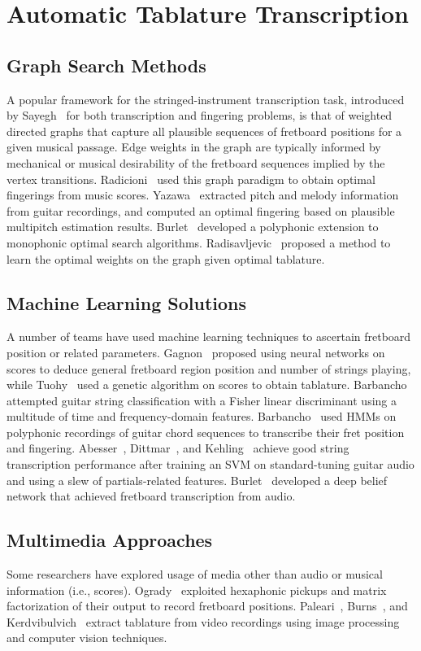 \documentclass[12pt]{cmuthesis}
\begin{document}
\section{Automatic Tablature Transcription}
\subsection{Graph Search Methods}
A popular framework for the stringed-instrument transcription task, introduced by Sayegh~\cite{sayegh1989} for both transcription and fingering problems, is that of weighted directed graphs that capture all plausible sequences of fretboard positions for a given musical passage. Edge weights in the graph are typically informed by mechanical or musical desirability of the fretboard sequences implied by the vertex transitions. Radicioni~\cite{radicioni2005} used this graph paradigm to obtain optimal fingerings from music scores. Yazawa~\cite{yazawa2013} extracted pitch and melody information from guitar recordings, and computed an optimal fingering based on plausible multipitch estimation results. Burlet~\cite{burlet2013} developed a polyphonic extension to monophonic optimal search algorithms. Radisavljevic~\cite{radisav2004} proposed a method to learn the optimal weights on the graph given optimal tablature.

\subsection{Machine Learning Solutions}
A number of teams have used machine learning techniques to ascertain fretboard position or related parameters. Gagnon~\cite{gagnon2003} proposed using neural networks on scores to deduce general fretboard region position and number of strings playing, while Tuohy~\cite{tuohy2006} used a genetic algorithm on scores to obtain tablature. Barbancho~\cite{barbancho2009} attempted guitar string classification with a Fisher linear discriminant using a multitude of time and frequency-domain features. Barbancho~\cite{barbanchoa2012} used HMMs on polyphonic recordings of guitar chord sequences to transcribe their fret position and fingering. Abesser~\cite{abesser2012}, Dittmar~\cite{dittmar2013}, and Kehling~\cite{kehling2014} achieve good string transcription performance after training an SVM on standard-tuning guitar audio and using a slew of partials-related features. Burlet~\cite{burlet2015} developed a deep belief network that achieved fretboard transcription from audio.

\subsection{Multimedia Approaches}
Some researchers have explored usage of media other than audio or musical information (i.e., scores). Ogrady~\cite{ogrady2009} exploited hexaphonic pickups and matrix factorization of their output to record fretboard positions. Paleari~\cite{paleari2008}, Burns~\cite{burns2006}, and Kerdvibulvich~\cite{kerd2007} extract tablature from video recordings using image processing and computer vision techniques.
\end{document}
